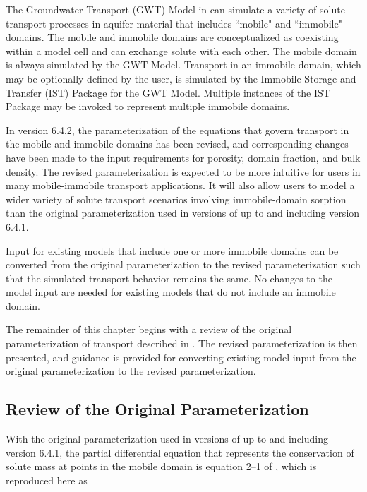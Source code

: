 
The Groundwater Transport (GWT) Model \citep{modflow6gwt} in \mf can simulate a variety of solute-transport processes in aquifer material that includes ``mobile" and ``immobile" domains. The mobile and immobile domains are conceptualized as coexisting within a model cell and can exchange solute with each other. The mobile domain is always simulated by the GWT Model.  Transport in an immobile domain, which may be optionally defined by the user, is simulated by the Immobile Storage and Transfer (IST) Package \citep{modflow6gwt} for the GWT Model. Multiple instances of the IST Package may be invoked to represent multiple immobile domains.

In \mf version 6.4.2, the parameterization of the equations that govern transport in the mobile and immobile domains has been revised, and corresponding changes have been made to the input requirements for porosity, domain fraction, and bulk density. The revised parameterization is expected to be more intuitive for users in many mobile-immobile transport applications. It will also allow users to model a wider variety of solute transport scenarios involving immobile-domain sorption than the original parameterization used in versions of \mf up to and including version 6.4.1.

Input for existing \mf models that include one or more immobile domains can be converted from the original parameterization to the revised parameterization such that the simulated transport behavior remains the same. No changes to the model input are needed for existing \mf models that do not include an immobile domain.

The remainder of this chapter begins with a review of the original parameterization of transport described in \citep{modflow6gwt}. The revised parameterization is then presented, and guidance is provided for converting existing model input from the original parameterization to the revised parameterization.

\subsection{Review of the Original Parameterization} \label{sec:origparamreview}

With the original parameterization used in versions of \mf up to and including version 6.4.1, the partial differential equation that represents the conservation of solute mass at points in the mobile domain is equation 2--1 of \cite{modflow6gwt}, which is reproduced here as

